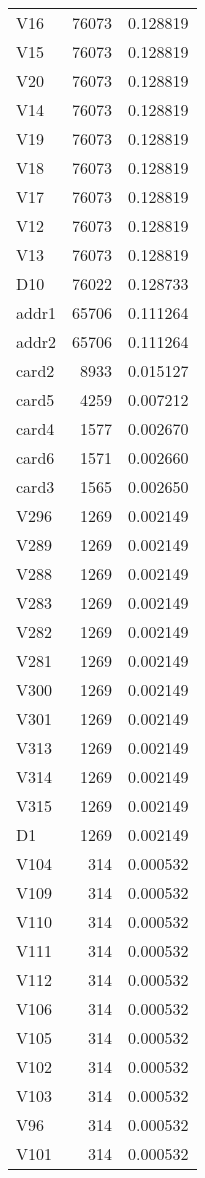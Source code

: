 \begin{tabular}{lrr}
V16 & 76073 & 0.128819 \\
V15 & 76073 & 0.128819 \\
V20 & 76073 & 0.128819 \\
V14 & 76073 & 0.128819 \\
V19 & 76073 & 0.128819 \\
V18 & 76073 & 0.128819 \\
V17 & 76073 & 0.128819 \\
V12 & 76073 & 0.128819 \\
V13 & 76073 & 0.128819 \\
D10 & 76022 & 0.128733 \\
addr1 & 65706 & 0.111264 \\
addr2 & 65706 & 0.111264 \\
card2 & 8933 & 0.015127 \\
card5 & 4259 & 0.007212 \\
card4 & 1577 & 0.002670 \\
card6 & 1571 & 0.002660 \\
card3 & 1565 & 0.002650 \\
V296 & 1269 & 0.002149 \\
V289 & 1269 & 0.002149 \\
V288 & 1269 & 0.002149 \\
V283 & 1269 & 0.002149 \\
V282 & 1269 & 0.002149 \\
V281 & 1269 & 0.002149 \\
V300 & 1269 & 0.002149 \\
V301 & 1269 & 0.002149 \\
V313 & 1269 & 0.002149 \\
V314 & 1269 & 0.002149 \\
V315 & 1269 & 0.002149 \\
D1 & 1269 & 0.002149 \\
V104 & 314 & 0.000532 \\
V109 & 314 & 0.000532 \\
V110 & 314 & 0.000532 \\
V111 & 314 & 0.000532 \\
V112 & 314 & 0.000532 \\
V106 & 314 & 0.000532 \\
V105 & 314 & 0.000532 \\
V102 & 314 & 0.000532 \\
V103 & 314 & 0.000532 \\
V96 & 314 & 0.000532 \\
V101 & 314 & 0.000532 \\

\end{tabular}
